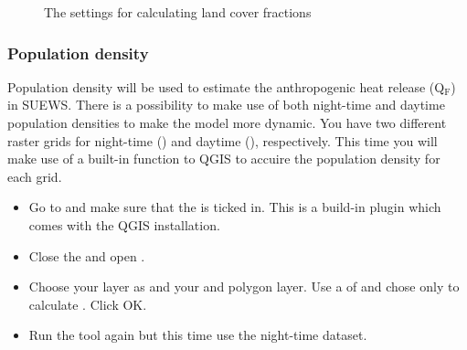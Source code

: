 \documentclass[letterpaper,10pt,english]{sphinxmanual}
\begin{document}
\begin{figure}[htbp]
\centering
\capstart

\noindent{}
\caption{The settings for calculating land cover fractions}\label{\detokenize{Tutorials/SuewsSpatial:id13}}\end{figure}


\subsubsection{Population density}
\label{\detokenize{Tutorials/SuewsSpatial:population-density}}
Population density will be used to estimate the anthropogenic heat release (Q$_{\text{F}}$) in SUEWS. There is a possibility to make use of both night-time and daytime population densities to make the model more dynamic. You have two different raster grids for night-time () and daytime (), respectively. This time you will make use of a built-in function to QGIS to accuire the population density for each grid.
\begin{itemize}
\item {} 
Go to  and make sure that the  is ticked in. This is a build-in plugin which comes with the QGIS installation.

\item {} 
Close the  and open .

\item {} 
Choose your  layer as  and your  and polygon layer. Use a  of  and chose only to calculate . Click OK.

\item {} 
Run the tool again but this time use the night-time dataset.

\end{itemize}
\end{document}

